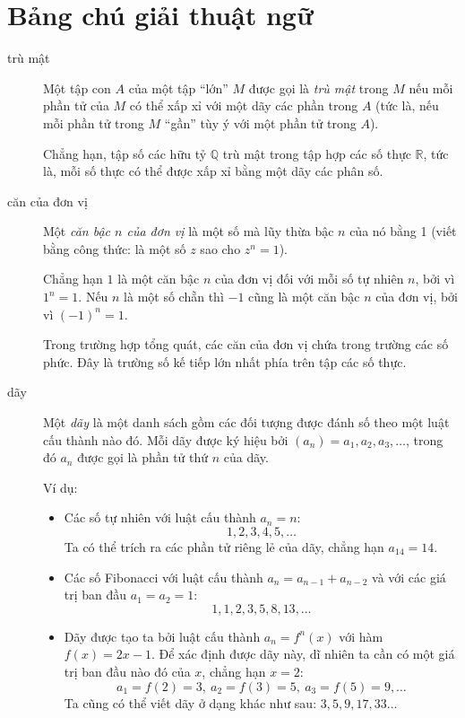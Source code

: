\section*{Bảng chú giải thuật ngữ}
\begin{description}
	\item[trù mật] Một tập con $A$ của một tập \enquote{lớn} $M$ được gọi là \emph{trù mật} trong $M$ nếu mỗi phần tử của $M$ có thể xấp xỉ với một dãy các phần trong $A$ (tức là, nếu mỗi phần tử trong $M$ \enquote{gần} tùy ý với một phần tử trong $A$).

		Chẳng hạn, tập số các hữu tỷ $\mathbb Q$ trù mật trong tập hợp các số thực $\mathbb R$, tức là, mỗi số thực có thể được xấp xỉ bằng một dãy các phân số. 

	\item[căn của đơn vị] Một \emph{căn bậc $n$ của đơn vị } là một số mà lũy thừa bậc $n$ của nó bằng 1 (viết bằng công thức: là một số $z$ sao cho $z^n=1$). 

		Chẳng hạn $1$ là một căn bậc $n$ của đơn vị đối với mỗi số tự nhiên $n$, bởi vì $1^n=1$. Nếu $n$ là một số chẵn thì $-1$ cũng là một căn bậc $n$ của đơn vị, bởi vì $(-1)^n=1$.

		Trong trường hợp tổng quát, các căn của đơn vị chứa trong trường các số phức. Đây là trường số kế tiếp lớn nhất phía trên tập các số thực. 

	\item[dãy] Một \emph{dãy} là một danh sách gồm các đối tượng được đánh số theo một luật cấu thành nào đó. Mỗi dãy được ký hiệu bởi $(a_n) = a_1,a_2,a_3,\dots $, trong đó $a_n$ được gọi là phần tử thứ $n$ của dãy. 

		Ví dụ:
		\begin{itemize}
		\item Các số tự nhiên với luật cấu thành $a_n = n$:
			\begin{equation*}
				1,2,3,4,5,\dotsc{}
			\end{equation*}
			Ta có thể trích ra các phần tử riêng lẻ của dãy, chẳng hạn $a_{14} = 14$. 
		\item Các số Fibonacci với luật cấu thành $a_n = a_{n-1}+a_{n-2}$ và với các giá trị ban đầu $a_1 = a_2 = 1$:
			\begin{equation*}
			1,1,2,3,5,8,13,\dotsc{}
			\end{equation*}
		\item Dãy được tạo ta bởi luật cấu thành $a_n = f^n(x)$ với hàm $f(x) = 2x-1$. Để xác định được dãy này, dĩ nhiên ta cần có một giá trị ban đầu nào đó của $x$, chẳng hạn $x=2$: 
			\begin{equation*}
				a_1 = f(2) = 3,\ a_2 = f(3) = 5,\ a_3 = f(5) = 9,\dotsc
			\end{equation*}
			Ta cũng có thể viết dãy ở dạng khác như sau: $3,5,9,17,33\dotsc{}$
		\end{itemize}


\end{description}
